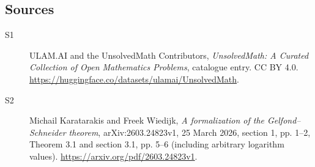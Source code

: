 \documentclass[11pt]{article}
\begin{document}
\subsection{Sources}
\begin{description}
\item[\hypertarget{source:statement:1}{S1}] ULAM.AI and the UnsolvedMath Contributors, \emph{UnsolvedMath: A Curated Collection of Open Mathematics Problems}, catalogue entry. CC BY 4.0. \url{https://huggingface.co/datasets/ulamai/UnsolvedMath}.
\item[\hypertarget{source:statement:2}{S2}] Michail Karatarakis and Freek Wiedijk, \emph{A formalization of the Gelfond--Schneider theorem}, arXiv:2603.24823v1, 25 March 2026, section 1, pp. 1--2, Theorem 3.1 and section 3.1, pp. 5--6 (including arbitrary logarithm values). \url{https://arxiv.org/pdf/2603.24823v1}.
\end{description}
\label{end:statement}
\end{document}
